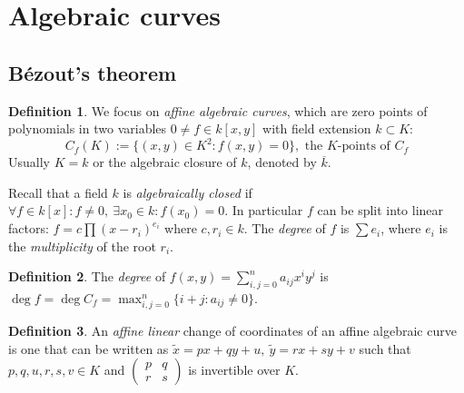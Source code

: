 \documentclass{article}
\theoremstyle{definition}
\newtheorem{defn}{Definition}[subsection]
\begin{document}
\section{Algebraic curves}
\subsection{Bézout's theorem}
\begin{defn}
We focus on \textit{affine algebraic curves}, which are zero points of polynomials in two variables $0\neq f\in k[x,y]$ with field extension $k\subset K$:
\[
C_f(K):=\{(x,y)\in K^2:f(x,y)=0\},\text{ the }K\text{-points of }C_f
\]
Usually $K=k$ or the algebraic closure of $k$, denoted by $\overline k$.
\end{defn}

Recall that a field $k$ is \textit{algebraically closed} if $\forall f\in k[x]:f\neq 0,\ \exists x_0\in k:f(x_0)=0$. In particular $f$ can be split into linear factors: $f=c\prod (x-r_i)^{e_i}$ where $c,r_i\in k$. The \textit{degree} of $f$ is $\sum e_i$, where $e_i$ is the \textit{multiplicity} of the root $r_i$.

\begin{defn}
The \textit{degree} of $f(x,y)=\sum_{i,j=0}^n a_{ij}x^iy^j$ is $\deg f=\deg C_f=\max_{i,j=0}^n\{i+j:a_{ij}\neq 0\}$.
\end{defn}

\begin{defn}
An \textit{affine linear} change of coordinates of an affine algebraic curve is one that can be written as $\widetilde x=px+qy+u,\ \widetilde y=rx+sy+v$ such that $p,q,u,r,s,v\in K$ and $\begin{pmatrix}p&q\\r&s\end{pmatrix}$ is invertible over $K$.
\end{defn}
\end{document}
